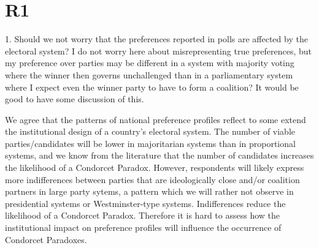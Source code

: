 \documentclass[a4paper, 12pt]{scrartcl}
\theoremstyle{break}
\newenvironment{changes}{\par\color{violet}\par\addvspace{\baselineskip}}{\par\addvspace{\baselineskip}}
\begin{document}

\newpage
\section*{R1} 
\begin{changes}
1. Should we not worry that the preferences reported in polls are affected by the electoral system? I do not worry here about misrepresenting true preferences, but my preference over parties may be different in a system with majority voting where the winner then governs unchallenged than in a parliamentary system where I expect even the winner party to have to form a coalition? It would be good to have some discussion of this.
\end{changes}

We agree that the patterns of national preference profiles reflect to some extend the institutional design of a country's electoral system. The number of viable parties/candidates will be lower in majoritarian systems than in proportional systems, and we know from the literature that the number of candidates increases the likelihood of a Condorcet Paradox. However, respondents will likely express more indifferences between parties that are ideologically close and/or coalition partners in large party sytems, a pattern which we will rather not observe in presidential systems or Westminster-type systems. Indifferences reduce the likelihood of a Condorcet Paradox. Therefore it is hard to assess how the institutional impact on preference profiles will influence the occurrence of Condorcet Paradoxes. 
\end{document}
